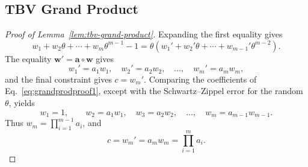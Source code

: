 \subsection{TBV Grand Product}
\label{appx:proof-grand-product}

\begin{proof}[Proof of Lemma~\ref{lem:tbv-grand-product}]
Expanding the first equality gives
\begin{equation}
\label{eq:grandprodproof1}
  w_1+w_2\theta+\cdots+w_m\theta^{m-1}-1
  =\theta\left(w_1'+w_2'\theta+\cdots+w_{m-1}'\theta^{m-2}\right).
\end{equation}
The equality $\bm w'=\bm a\circ\bm w$ gives
\begin{equation}
\label{eq:grandprodproof2}
  w_1'=a_1w_1,\quad w_2'=a_2w_2,\quad\ldots,\quad w_m'=a_mw_m,
\end{equation}
and the final constraint gives $c=w_m'$.  Comparing the coefficients of
Eq.~\eqref{eq:grandprodproof1}, except with the Schwartz--Zippel error for the
random $\theta$, yields
\[
  w_1=1,\qquad
  w_2=a_1w_1,\quad
  w_3=a_2w_2,\quad\ldots,\quad
  w_m=a_{m-1}w_{m-1}.
\]
Thus $w_m=\prod_{i=1}^{m-1}a_i$, and
\[
  c=w_m'=a_mw_m=\prod_{i=1}^m a_i.
\]
\end{proof}
